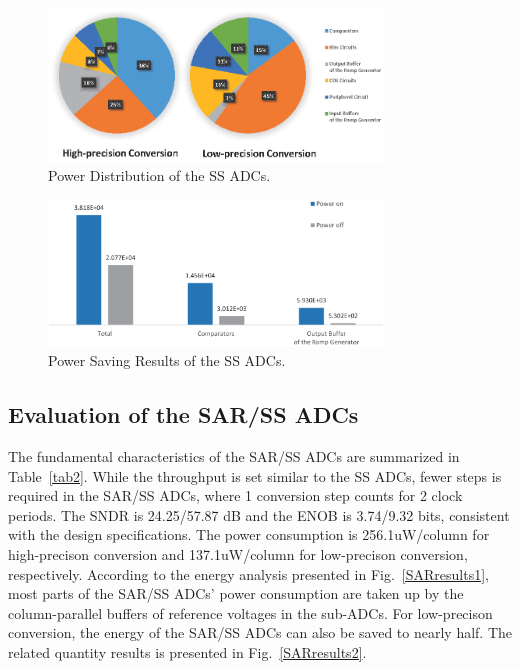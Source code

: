 \documentclass[conference]{IEEEtran}
\begin{document}
\begin{figure}[htbp]
	\centerline{\includegraphics[width=3.5in]{./Figures/SSResults1.eps}}
	\caption{Power Distribution of the SS ADCs.}
	\label{SSresults1}
\end{figure}

\begin{figure}[htbp]
	\centerline{\includegraphics[width=3.5in]{./Figures/SSResults2.eps}}
	\caption{Power Saving Results of the SS ADCs.}
	\label{SSresults2}
\end{figure} 

\subsection{Evaluation of the SAR/SS ADCs}

The fundamental characteristics of the SAR/SS ADCs are summarized in Table~\ref{tab2}. 
While the throughput is set similar to the SS ADCs, fewer steps is required in the SAR/SS ADCs, where 1 conversion step counts for 2 clock periods. 
The SNDR is 24.25/57.87 dB and the ENOB is 3.74/9.32 bits, consistent with the design specifications. 
The power consumption is 256.1uW/column for high-precison conversion and 137.1uW/column for low-precison conversion, respectively. 
According to the energy analysis presented in Fig.~\ref{SARresults1}, most parts of the SAR/SS ADCs' power consumption 
are taken up by the column-parallel buffers of reference voltages in the sub-ADCs.
For low-precison conversion, the energy of the SAR/SS ADCs can also be saved to nearly half. 
The related quantity results is presented in Fig.~\ref{SARresults2}.
\end{document}
